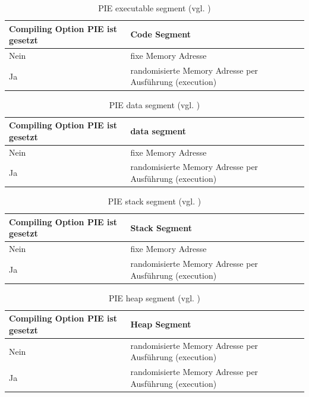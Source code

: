  \begin{table}
    \begin{center}
         \begin{tabular}{|p{6cm}|p{9cm}|} \hline
            Compiling Option PIE ist gesetzt & Code Segment \\ \hline
            Nein & fixe Memory Adresse\\ \hline
            Ja & randomisierte Memory Adresse per Ausführung (execution)\\ \hline
        \end{tabular}
        \caption{PIE executable segment (vgl. \cite{iOSSec[5]}) }
       \label{tab:PIE executable segment}
    \end{center}
\end{table}

 \begin{table}
    \begin{center}
       \begin{tabular}{|p{6cm}|p{9cm}|} \hline
            Compiling Option PIE ist gesetzt & data segment\\ \hline
            Nein & fixe Memory Adresse\\ \hline
            Ja & randomisierte Memory Adresse per Ausführung (execution)\\ \hline
        \end{tabular}
        \caption{PIE data segment (vgl. \cite{iOSSec[5]})}
       \label{tab:PIE data segment}
    \end{center}
\end{table}

\begin{table}
    \begin{center}
        \begin{tabular}{|p{6cm}|p{9cm}|} \hline
            Compiling Option PIE ist gesetzt & Stack Segment\\ \hline
            Nein & fixe Memory Adresse\\ \hline
             Ja & randomisierte Memory Adresse per Ausführung (execution)\\ \hline
        \end{tabular}
         \caption{PIE stack segment (vgl. \cite{iOSSec[5]})}
       \label{tab:PIE stack segment}
    \end{center}
\end{table}    

\begin{table}
    \begin{center}
       \begin{tabular}{|p{6cm}|p{9cm}|} \hline
            Compiling Option PIE ist gesetzt & Heap Segment\\ \hline
            Nein & randomisierte Memory Adresse per Ausführung (execution)\\ \hline
            Ja & randomisierte Memory Adresse per Ausführung (execution)\\ \hline
        \end{tabular}
        \caption{PIE heap segment (vgl. \cite{iOSSec[5]}) }
       \label{tab:PIE heap segment}
    \end{center}
\end{table}

